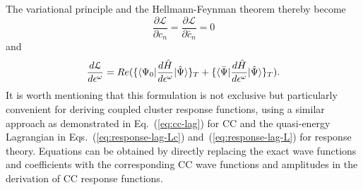 The variational principle and the Hellmann-Feynman theorem thereby become
\begin{equation}
\frac{\partial \mathcal{L}}{\partial c_{n}} = \frac{\partial \mathcal{L}}{\partial \bar{c}_{n}} = 0
\end{equation}
and
\begin{equation}
\frac{d\mathcal{	L}}{d\epsilon^{\omega}}=Re(\{\langle\Psi_{0} |\frac{d\hat{H}}{d\epsilon^{\omega}}| \hat{\Psi} \rangle\}_{T} + \{\langle\bar{\Psi} |\frac{d\hat{H}}{d\epsilon^{\omega}}| \hat{\Psi} \rangle\}_{T}).
\end{equation}
It is worth mentioning that this formulation is not exclusive but particularly convenient for deriving coupled cluster response functions, using a similar approach as demonstrated in Eq.~(\ref{eq:cc-lag}) for CC and the quasi-energy Lagrangian in Eqs.~(\ref{eq:response-lag-Lc}) and~(\ref{eq:response-lag-L}) for response theory. Equations can be obtained by directly replacing the exact wave functions and coefficients with the corresponding CC wave functions and amplitudes in the derivation of CC response functions.

